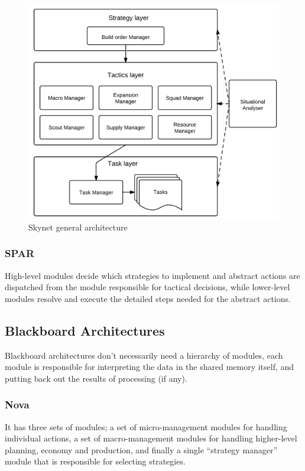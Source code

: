 \begin{figure}[h!tbp]
\centering
\includegraphics[scale=0.8]{graphics/skynet.png}
\caption{Skynet general architecture}
\label{fig:bthaiarch}
\end{figure}

\subsubsection{SPAR}
High-level modules decide which strategies to implement and abstract actions
are dispatched from the module responsible for tactical decisions, while
lower-level modules resolve and execute the detailed steps needed for the
abstract actions.

\subsection{Blackboard Architectures}
Blackboard architectures don't necessarily need a hierarchy of modules, each
module is responsible for interpreting the data in the shared memory itself,
and putting back out the results of processing (if any).

\subsubsection{Nova}
It has three sets of modules; a set of micro-management modules for handling
individual actions, a set of macro-management modules for handling higher-level
planning, economy and production, and finally a single ``strategy manager''
module that is responsible for selecting strategies.


